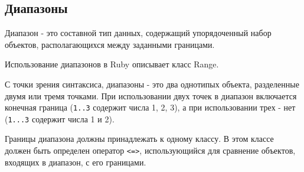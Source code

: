 \subsection{Диапазоны}

Диапазон - это составной тип данных, содержащий упорядоченный набор объектов, располагающихся между заданными границами. 

Использование диапазонов в Ruby описывает класс Range.

С точки зрения синтаксиса, диапазоны - это два однотипых объекта, разделенные двумя или тремя точками. При использовании двух точек в диапазон включается конечная граница (\verb!1..3! содержит числа 1, 2, 3), а при использовании трех - нет (\verb!1...3! содержит числа 1 и 2).

\begin{note}
  Границы диапазона должны принадлежать к одному классу. В этом классе должен быть определен оператор \verb!<=>!, использующийся для сравнение объектов, входящих в диапазон, с его границами.
\end{note}
